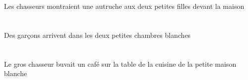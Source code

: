 \begin{exe}
\DEFSgOblP{}   \maisonDSgOblP{}   \DEVANTP{}   \DEFPlErgP{}   \chasseurCPlErgP{}    \DEFDuDatP{}   \petitCDuP{}   \filleCDuDatP{}   \INDSgAbsP{}   \autrucheDSgAbsP{}  \montrerVdPstDSgP{}\\
\DEFSgOblG{}   \maisonDSgOblG{}   \DEVANTG{}   \DEFPlErgG{}   \chasseurCPlErgG{}    \DEFDuDatG{}   \petitCDuG{}   \filleCDuDatG{}   \INDSgAbsG{}   \autrucheDSgAbsG{}  \montrerVdPstDSgG{}\\
Les chasseurs montraient une autruche aux deux petites filles devant la maison
\ex\glll
\INDPlAbs{}   \garconBPlAbs{}    \DEFDuObl{}   \petitBDu{}   \blancBDu{}   \chambreBDuObl{}   \DANS{}  \arriverViPrsBPl{}\\
\INDPlAbsP{}   \garconBPlAbsP{}    \DEFDuOblP{}   \petitBDuP{}   \blancBDuP{}   \chambreBDuOblP{}   \DANSP{}  \arriverViPrsBPlP{}\\
\INDPlAbsG{}   \garconBPlAbsG{}    \DEFDuOblG{}   \petitBDuG{}   \blancBDuG{}   \chambreBDuOblG{}   \DANSG{}  \arriverViPrsBPlG{}\\
Des garçons arrivent dans les deux petites chambres blanches
\ex\glll
\DEFSgObl{}    \DEFSgObl{}    \DEFSgObl{}   \petitDSg{}   \blancDSg{}   \maisonDSgObl{}   \DE{}   \cuisineCSgObl{}   \DE{}   \tableCSgObl{}   \SUR{}   \DEFSgErg{}   \grosCSg{}   \chasseurCSgErg{}   \INDSgAbs{}   \cafeDSgAbs{}  \boireVtPstDSg{}\\
\DEFSgOblP{}    \DEFSgOblP{}    \DEFSgOblP{}   \petitDSgP{}   \blancDSgP{}   \maisonDSgOblP{}   \DEP{}   \cuisineCSgOblP{}   \DEP{}   \tableCSgOblP{}   \SURP{}   \DEFSgErgP{}   \grosCSgP{}   \chasseurCSgErgP{}   \INDSgAbsP{}   \cafeDSgAbsP{}  \boireVtPstDSgP{}\\
\DEFSgOblG{}    \DEFSgOblG{}    \DEFSgOblG{}   \petitDSgG{}   \blancDSgG{}   \maisonDSgOblG{}   \DEG{}   \cuisineCSgOblG{}   \DEG{}   \tableCSgOblG{}   \SURG{}   \DEFSgErgG{}   \grosCSgG{}   \chasseurCSgErgG{}   \INDSgAbsG{}   \cafeDSgAbsG{}  \boireVtPstDSgG{}\\
Le gros chasseur buvait un café sur la table de la cuisine de la petite maison blanche
\ex\glll
\INDSgAbs{}   \petitASg{}   \sourisASgAbs{}    \DEFSgObl{}    \DEFSgObl{}   \grosDSg{}   \chatDSgObl{}   \DE{}   \maisonDSgObl{}   \DANS{}  \entrerViPrsASg{}\\
\INDSgAbsP{}   \petitASgP{}   \sourisASgAbsP{}    \DEFSgOblP{}    \DEFSgOblP{}   \grosDSgP{}   \chatDSgOblP{}   \DEP{}   \maisonDSgOblP{}   \DANSP{}  \entrerViPrsASgP{}\\
\INDSgAbsG{}   \petitASgG{}   \sourisASgAbsG{}    \DEFSgOblG{}    \DEFSgOblG{}   \grosDSgG{}   \chatDSgOblG{}   \DEG{}   \maisonDSgOblG{}   \DANSG{}  \entrerViPrsASgG{}\\

\end{exe}

